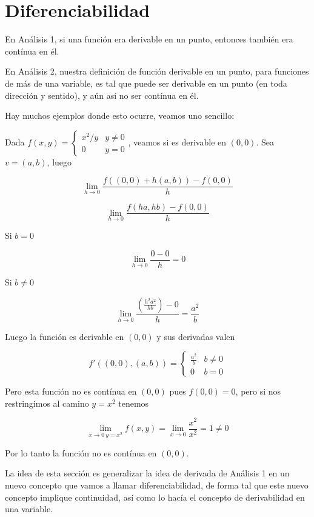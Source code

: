 
\chapter{Diferenciabilidad}

En Análisis 1, si una función era derivable en un punto, entonces también era contínua en él.

En Análisis 2, nuestra definición de función derivable en un punto, para funciones de más de una variable, es tal que puede ser derivable en un punto (en toda dirección y sentido), y aún así no ser contínua en él. 

Hay muchos ejemplos donde esto ocurre, veamos uno sencillo:

Dada $f(x,y) = \begin{cases} x^2/y & y \neq 0 \\ 0 & y=0 \end{cases}$, veamos si es derivable en $(0,0)$.  Sea $v = (a,b)$, luego

$$ \lim_{h \to 0} \frac{f((0,0) + h(a,b)) - f(0,0)}{h} $$

$$ \lim_{h \to 0} \frac{f(ha,hb) - f(0,0)}{h} $$

Si $b = 0$

$$ \lim_{h \to 0} \frac{0 - 0}{h} = 0 $$

Si $b \neq 0$

$$ \lim_{h \to 0} \frac{ \left( \frac{h^2 a^2}{hb} \right) - 0 }{h} = \frac{a^2}{b} $$

Luego la función es derivable en $(0,0)$ y sus derivadas valen

$$ f'((0,0),(a,b)) = \begin{cases} \frac{a^2}{b} & b \neq 0 \\ 0 & b = 0 \end{cases}$$

Pero esta función no es contínua en $(0,0)$ pues $f(0,0) = 0$, pero si nos restringimos al camino $y = x^2$ tenemos

$$ \lim_{ x \to 0 \ y=x^2 } f(x,y) = \lim_{x \to 0} \frac{x^2}{x^2} = 1 \neq 0$$

Por lo tanto la función no es contínua en $(0,0)$.

La idea de esta sección es generalizar la idea de derivada de Análisis 1 en un nuevo concepto que vamos a llamar diferenciabilidad, de forma tal que este nuevo concepto implique continuidad, así como lo hacía el concepto de derivabilidad en una variable.

